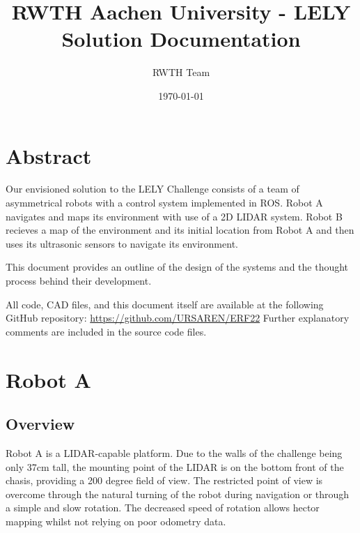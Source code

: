 \documentclass[11pt]{article}
\title{RWTH Aachen University - LELY Solution Documentation}
\author{RWTH Team}
\date{\today}
\begin{document}
	\maketitle	
	
	\section{Abstract}
	
	Our envisioned solution to the LELY Challenge consists of a team of asymmetrical robots with a control system implemented in ROS. Robot A navigates and maps its environment with use of a 2D LIDAR system. Robot B recieves a map of the environment and its initial location from Robot A and then uses its ultrasonic sensors to navigate its environment.\newline
	
	This document provides an outline of the design of the systems and the thought process behind their development. \newline
	
	All code, CAD files, and this document itself are available at the following GitHub repository: \href{https://github.com/URSAREN/ERF22}{https://github.com/URSAREN/ERF22} 
	\newline
	\newline
	Further explanatory comments are included in the source code files.
	
	\section{Robot A}
	
	\subsection{Overview}
	Robot A is a LIDAR-capable platform. Due to the walls of the challenge being only 37cm tall, the mounting point of the LIDAR is on the bottom front of the chasis, providing a 200 degree field of view. The restricted point of view is overcome through the natural turning of the robot during navigation or through a simple and slow rotation. The decreased speed of rotation allows hector mapping whilst not relying on poor odometry data.
	
\end{document}
